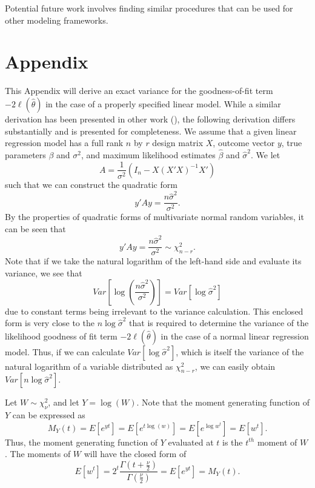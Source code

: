 \documentclass[12pt]{article} %
\theoremstyle{definition}
\begin{document}
Potential future work involves finding similar procedures that can be used for other modeling frameworks.



\section*{Appendix}

This Appendix will derive an exact variance for the goodness-of-fit term $-2 \ell (\hat{\theta} )$ in the case of a properly specified
linear model. While a similar derivation has been presented in other work (\cite{McQuarrie}), the following derivation differs substantially and is presented for completeness.
We assume that a given linear regression model has a full rank $n$ by $r$ design matrix $X$, outcome vector $y$, true parameters $\beta$ and $\sigma^2$,
and maximum likelihood estimates $\hat{\beta}$ and $\hat{\sigma}^2$. We let
\begin{equation*}
	A = \frac{1}{\sigma^2} (I_n - X(X'X)^{-1}X') 
\end{equation*}
such that we can construct the quadratic form
\begin{equation*}
	y'Ay = \frac{n \hat{\sigma}^2}{\sigma^2} .
\end{equation*}
By the properties of quadratic forms of multivariate normal random variables, it can be seen that
\begin{equation}
	y'Ay = \frac{n \hat{\sigma}^2}{\sigma^2} \sim \chi^2_{n-r} .
\end{equation}
Note that if we take the natural logarithm of the left-hand side and evaluate its variance, we see that
\begin{equation}
	Var \left[ \log(\frac{n \hat{\sigma}^2}{\sigma^2}) \right]  = Var \left[ \log \hat{\sigma}^2 \right]
\end{equation}
due to constant terms being irrelevant to the variance calculation. This enclosed form is very close to the $n \log \hat{\sigma}^2$ that is required
to determine the variance of the likelihood goodness of fit term $-2 \ell (\hat{\theta} )$ in the case of a normal linear regression model.
Thus, if we can calculate $Var \left[ \log \hat{\sigma}^2 \right]$, which is itself the variance
of the natural logarithm of a variable distributed as $\chi^2_{n-r}$, we can easily obtain $Var \left[ n \log \hat{\sigma}^2 \right]$.

Let $W \sim \chi^2_{\nu}$, and let $Y = \log(W)$. Note that the moment generating function of $Y$ can be expressed as
\begin{equation*}
	M_Y (t) = E \left[ e^{yt} \right] = E \left[ e^{t\log(w)} \right] = E \left[ e^{\log w^t} \right] = E \left[ w^t \right] .
\end{equation*}
Thus, the moment generating function of $Y$ evaluated at $t$ is the $t^{th}$ moment of $W$. The moments of $W$ will have the
closed form of
\begin{equation*}
	E \left[ w^t \right] = 2^t \frac{\Gamma (t + \frac{\nu}{2})}{\Gamma (\frac{\nu}{2})} = E \left[ e^{yt} \right] = M_Y (t) .
\end{equation*}
\end{document}
